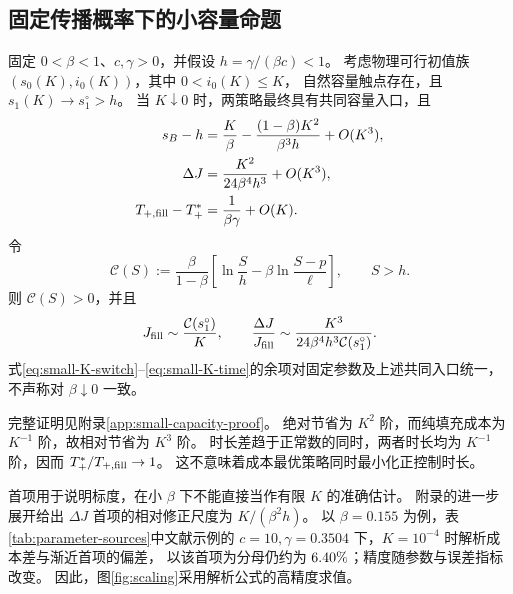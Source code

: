 \subsection{固定传播概率下的小容量命题}
\begin{proposition}[小容量的成本与时长标度]
\label{prop:small-capacity}
固定 $0<\beta<1$、$c,\gamma>0$，并假设 $h=\gamma/(\beta c)<1$。
考虑物理可行初值族 $(s_0(K),i_0(K))$，其中 $0<i_0(K)\le K$，
自然容量触点存在，且 $s_1(K)\to s_1^\circ>h$。
当 $K\downarrow0$ 时，两策略最终具有共同容量入口，且
\begin{align}
 s_B-h&=\frac K\beta-\frac{(1-\beta)K^2}{\beta^3h}+O(K^3),
 \label{eq:small-K-switch}\\
 \Delta J&=\frac{K^2}{24\beta^4h^3}+O(K^3),
 \label{eq:small-K-cost}\\
 T_{+,\rm fill}-T_+^*&=\frac1{\beta\gamma}+O(K).
 \label{eq:small-K-time}
\end{align}
令
\begin{equation}
 \mathcal C(S):=\frac\beta{1-\beta}
 \left[\ln\frac Sh-\beta\ln\frac{S-p}{\ell}\right],\qquad S>h.
 \label{eq:small-K-C}
\end{equation}
则 $\mathcal C(S)>0$，并且
\begin{equation}
 J_{\rm fill}\sim\frac{\mathcal C(s_1^\circ)}K,\qquad
 \frac{\Delta J}{J_{\rm fill}}
 \sim\frac{K^3}{24\beta^4h^3\mathcal C(s_1^\circ)}.
 \label{eq:small-K-relative}
\end{equation}
式\eqref{eq:small-K-switch}--\eqref{eq:small-K-time}的余项对固定参数及上述共同入口统一，
不声称对 $\beta\downarrow0$ 一致。
\end{proposition}
完整证明见附录\ref{app:small-capacity-proof}。
绝对节省为 $K^2$ 阶，而纯填充成本为 $K^{-1}$ 阶，故相对节省为 $K^3$ 阶。
时长差趋于正常数的同时，两者时长均为 $K^{-1}$ 阶，因而 $T_+^*/T_{+,\rm fill}\to1$。
这不意味着成本最优策略同时最小化正控制时长。

首项用于说明标度，在小 $\beta$ 下不能直接当作有限 $K$ 的准确估计。
附录的进一步展开给出 $\Delta J$ 首项的相对修正尺度为 $K/(\beta^2h)$。
以 $\beta=0.155$ 为例，表\ref{tab:parameter-sources}中文献示例的
$c=10,\gamma=0.3504$ 下，$K=10^{-4}$ 时解析成本差与渐近首项的偏差，
以该首项为分母仍约为 $6.40\%$；精度随参数与误差指标改变。
因此，图\ref{fig:scaling}采用解析公式的高精度求值。

